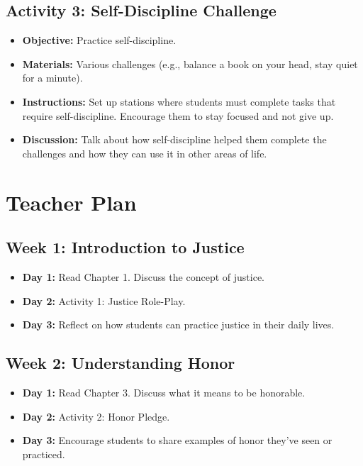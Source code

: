 \documentclass[11pt]{article}
\begin{document}
\subsection{Activity 3: Self-Discipline Challenge}
\label{sec:orgd419357}
\begin{itemize}
\item \textbf{\textbf{Objective:}} Practice self-discipline.
\item \textbf{\textbf{Materials:}} Various challenges (e.g., balance a book on your head, stay quiet for a minute).
\item \textbf{\textbf{Instructions:}} Set up stations where students must complete tasks that require self-discipline. Encourage them to stay focused and not give up.
\item \textbf{\textbf{Discussion:}} Talk about how self-discipline helped them complete the challenges and how they can use it in other areas of life.
\end{itemize}

\section{Teacher Plan}
\label{sec:org046dfaf}

\subsection{Week 1: Introduction to Justice}
\label{sec:org118c470}
\begin{itemize}
\item \textbf{\textbf{Day 1:}} Read Chapter 1. Discuss the concept of justice.
\item \textbf{\textbf{Day 2:}} Activity 1: Justice Role-Play.
\item \textbf{\textbf{Day 3:}} Reflect on how students can practice justice in their daily lives.
\end{itemize}

\subsection{Week 2: Understanding Honor}
\label{sec:org05fe9bc}
\begin{itemize}
\item \textbf{\textbf{Day 1:}} Read Chapter 3. Discuss what it means to be honorable.
\item \textbf{\textbf{Day 2:}} Activity 2: Honor Pledge.
\item \textbf{\textbf{Day 3:}} Encourage students to share examples of honor they’ve seen or practiced.
\end{itemize}
\end{document}

